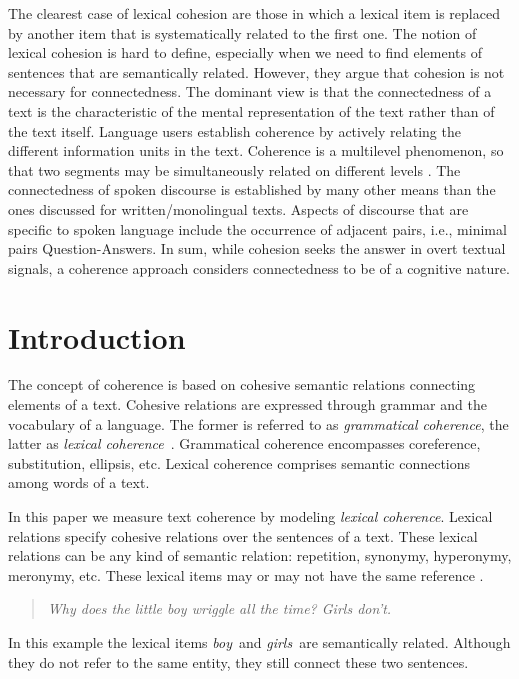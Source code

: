  The clearest case of lexical cohesion are those in which a lexical item is replaced by another item that is systematically related to the first one. 
 The notion of lexical cohesion is hard to define, especially when we need to find elements of sentences that are semantically related. 
 However, they argue that cohesion is not necessary for connectedness. 
 The dominant view is that the connectedness of a text is the characteristic of the mental representation of the text rather than of the text itself. 
Language users establish coherence by actively relating the different information units in the text. 
Coherence is a multilevel phenomenon, so that two segments may be simultaneously related on different levels \cite{sandres06}.
The connectedness of spoken discourse is established by many other means than the ones discussed for written/monolingual texts. 
Aspects of discourse that are specific to spoken language include the occurrence of adjacent pairs, i.e., minimal pairs Question-Answers. 
In sum, while cohesion seeks the answer in overt textual signals, a coherence approach considers connectedness to be of a cognitive nature.     


\section{Introduction}
\label{sec:introduction}
%
The concept of coherence is based on cohesive semantic relations
connecting elements of a text. Cohesive relations are expressed
through grammar and the vocabulary of a language. The former is referred
to as \emph{grammatical coherence}, the latter as \emph{lexical
  coherence}\ \cite{halliday76}. Grammatical coherence encompasses
coreference, substitution, ellipsis, etc. Lexical coherence comprises
semantic connections among words of a text.

In this paper we measure text coherence by modeling
\emph{lexical coherence}. Lexical relations specify
cohesive relations over the sentences of a text. These lexical
relations can be any kind of semantic relation: repetition, synonymy,
hyperonymy, meronymy, etc. These lexical items may or may not have the
same reference \cite{halliday76}. %

\begin{quote}
\emph{Why does the little boy wriggle all the time? Girls don't.}
\end{quote}

In this example the lexical items \emph{boy}\ and \emph{girls}\ are
semantically related. Although they do not refer to the same entity,
they still connect these two sentences.

